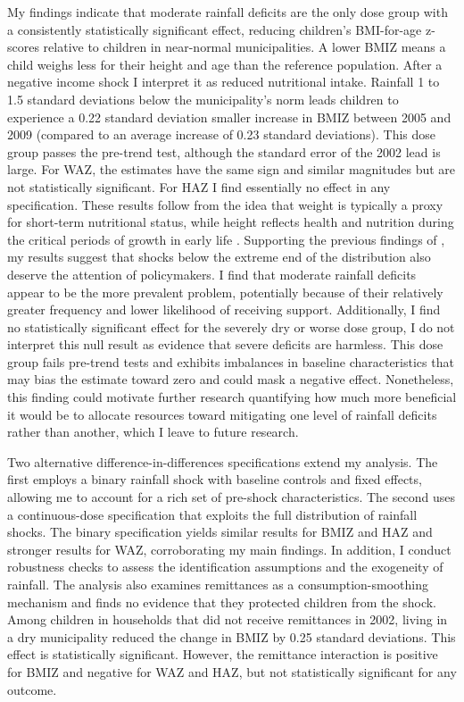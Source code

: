 My findings indicate that moderate rainfall deficits are the only dose group with a consistently statistically significant effect, reducing children's BMI-for-age z-scores relative to children in near-normal municipalities. A lower BMIZ means a child weighs less for their height and age than the reference population. After a negative income shock I interpret it as reduced nutritional intake. Rainfall 1 to 1.5 standard deviations below the municipality's norm leads children to experience a 0.22 standard deviation smaller increase in BMIZ between 2005 and 2009 (compared to an average increase of 0.23 standard deviations). This dose group passes the pre-trend test, although the standard error of the 2002 lead is large. For WAZ, the estimates have the same sign and similar magnitudes but are not statistically significant. For HAZ I find essentially no effect in any specification. These results follow from the idea that weight is typically a proxy for short-term nutritional status, while height reflects health and nutrition during the critical periods of growth in early life \parencite{currieEarlyLifeHealthAdult2013}. Supporting the previous findings of \textcite{almondChildhoodCircumstancesAdult2018}, my results suggest that shocks below the extreme end of the distribution also deserve the attention of policymakers. I find that moderate rainfall deficits appear to be the more prevalent problem, potentially because of their relatively greater frequency and lower likelihood of receiving support. Additionally, I find no statistically significant effect for the severely dry or worse dose group, I do not interpret this null result as evidence that severe deficits are harmless. This dose group fails pre-trend tests and exhibits imbalances in baseline characteristics that may bias the estimate toward zero and could mask a negative effect. Nonetheless, this finding could motivate further research quantifying how much more beneficial it would be to allocate resources toward mitigating one level of rainfall deficits rather than another, which I leave to future research.

Two alternative difference-in-differences specifications extend my analysis. The first employs a binary rainfall shock with baseline controls and fixed effects, allowing me to account for a rich set of pre-shock characteristics. The second uses a continuous-dose specification that exploits the full distribution of rainfall shocks. The binary specification yields similar results for BMIZ and HAZ and stronger results for WAZ, corroborating my main findings. In addition, I conduct robustness checks to assess the identification assumptions and the exogeneity of rainfall. The analysis also examines remittances as a consumption-smoothing mechanism and finds no evidence that they protected children from the shock. Among children in households that did not receive remittances in 2002, living in a dry municipality reduced the change in BMIZ by 0.25 standard deviations. This effect is statistically significant. However, the remittance interaction is positive for BMIZ and negative for WAZ and HAZ, but not statistically significant for any outcome.

